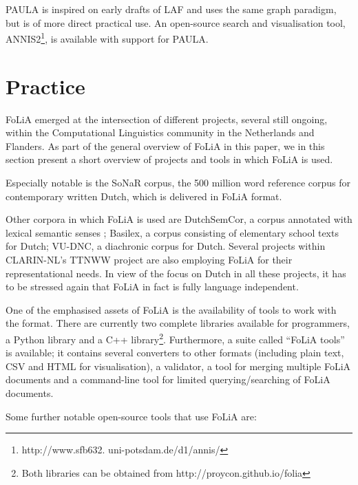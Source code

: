 \documentclass[a4paper,10pt,twoside]{article}
\begin{document}
PAULA is inspired on early drafts of LAF and uses the same graph paradigm, but
is of more direct practical use. An open-source search and visualisation tool,
ANNIS2\footnote{http://www.sfb632.  uni-potsdam.de/d1/annis/}, is available
with support for PAULA.


\section{Practice}
\label{sec:practice}

FoLiA emerged at the intersection of different projects, several still ongoing, within the Computational
Linguistics community in the Netherlands and Flanders. As part of the general overview of FoLiA in this paper, we in
this section present a short overview of projects and tools in which FoLiA is
used.
 
Especially notable is the SoNaR corpus, the 500 million word reference corpus for contemporary written Dutch, which is delivered in FoLiA format. 

Other corpora in which FoLiA is used are DutchSemCor, a corpus annotated with
lexical semantic senses \cite{DUTCHSEMCOR}; Basilex, a corpus consisting of
elementary school texts for Dutch; VU-DNC, a diachronic corpus for Dutch.
Several projects within CLARIN-NL's TTNWW project are also employing FoLiA for
their representational needs. In view of the focus on Dutch in all these
projects, it has to be stressed again that FoLiA in fact is fully language
independent.

One of the emphasised assets of FoLiA is the availability of tools to work with the
format. There are currently two complete libraries available for programmers, a Python
library and a C++ library\footnote{Both libraries can be obtained from
http://proycon.github.io/folia}. Furthermore, a suite called ``FoLiA tools'' is
available; it contains several converters to other formats (including plain
text, CSV and HTML for visualisation), a validator, a tool for merging
multiple FoLiA documents and a command-line tool for limited querying/searching of FoLiA documents.

Some further notable open-source tools that use FoLiA are:
\end{document}
